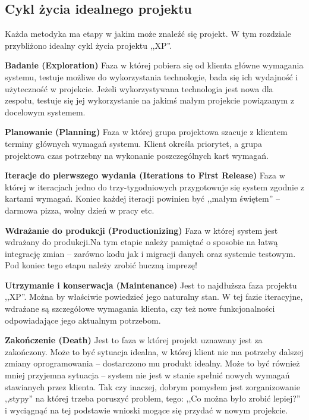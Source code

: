 \subsection{Cykl życia idealnego projektu}
\label{sec:ZMTOcykl}

Każda metodyka ma etapy w jakim może znaleźć się projekt. W tym rozdziale przybliżono idealny cykl życia projektu ,,XP''.

\begin{packed_enum}
    \item \textbf{Badanie (Exploration)} Faza w której pobiera się od klienta główne wymagania systemu, testuje możliwe do wykorzystania technologie, bada się ich wydajność i użyteczność w projekcie. Jeżeli wykorzystywana technologia jest nowa dla zespołu, testuje się jej wykorzystanie na jakimś małym projekcie powiązanym z docelowym systemem.
    \item \textbf{Planowanie (Planning)} Faza w której grupa projektowa szacuje z klientem terminy głównych wymagań systemu. Klient określa priorytet, a grupa projektowa czas potrzebny na wykonanie poszczególnych kart wymagań.
    \item \textbf{Iteracje do pierwszego wydania (Iterations to First Release)} Faza w której w iteracjach jedno do trzy-tygodniowych przygotowuje się system zgodnie z kartami wymagań. Koniec każdej iteracji powinien być ,,małym świętem'' -- darmowa pizza, wolny dzień w pracy etc.
    \item \textbf{Wdrażanie do produkcji (Productionizing)} Faza w której system jest wdrażany do produkcji.Na tym etapie należy pamiętać o sposobie na łatwą integrację zmian -- zarówno kodu jak i migracji danych oraz systemie testowym. Pod koniec tego etapu należy zrobić huczną imprezę!
    \item \textbf{Utrzymanie i konserwacja (Maintenance)} Jest to najdłuższa faza projektu ,,XP''. Można by właściwie powiedzieć jego naturalny stan. W tej fazie iteracyjne, wdrażane są szczegółowe wymagania klienta, czy też nowe funkcjonalności odpowiadające jego aktualnym potrzebom.
    \item \textbf{Zakończenie (Death)} Jest to faza w której projekt uznawany jest za zakończony. Może to być sytuacja idealna, w której klient nie ma potrzeby dalszej zmiany oprogramowania -- dostarczono mu produkt idealny. Może to być również mniej przyjemna sytuacja -- system nie jest w stanie spełnić nowych wymagań stawianych przez klienta. Tak czy inaczej, dobrym pomysłem jest zorganizowanie ,,stypy'' na której trzeba poruszyć problem, tego: ,,Co można było zrobić lepiej?'' i wyciągnąć na tej podstawie wnioski mogące się przydać w nowym projekcie.
\end{packed_enum}

